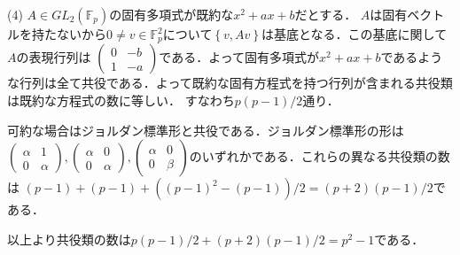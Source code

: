 \documentclass[
		book,
		head_space=20mm,
		foot_space=20mm,
		gutter=10mm,
		line_length=190mm
]{jlreq}
\begin{document}
(4)
$A\in GL_2(\mathbb{F}_p)$の固有多項式が既約な$x^2+ax+b$だとする．
$A$は固有ベクトルを持たないから$0\neq v\in \mathbb{F}_p^2$について$\left\{ v,Av \right\}$は基底となる．この基底に関して$A$の表現行列は
$\begin{pmatrix}
0 & -b \\
1 & -a
\end{pmatrix}$である．よって固有多項式が$x^2+ax+b$であるような行列は全て共役である．よって既約な固有方程式を持つ行列が含まれる共役類は既約な方程式の数に等しい．
すなわち$p(p-1)/2$通り．

可約な場合はジョルダン標準形と共役である．ジョルダン標準形の形は
$\begin{pmatrix}
\alpha & 1 \\
0 & \alpha
\end{pmatrix},\begin{pmatrix}
\alpha & 0 \\
0 & \alpha
\end{pmatrix},\begin{pmatrix}
\alpha & 0 \\
0 & \beta
\end{pmatrix}$のいずれかである．これらの異なる共役類の数は
$(p-1)+(p-1)+((p-1)^2-(p-1))/2=(p+2)(p-1)/2$である．

以上より共役類の数は$p(p-1)/2+(p+2)(p-1)/2=p^2-1$である．
\end{document}
